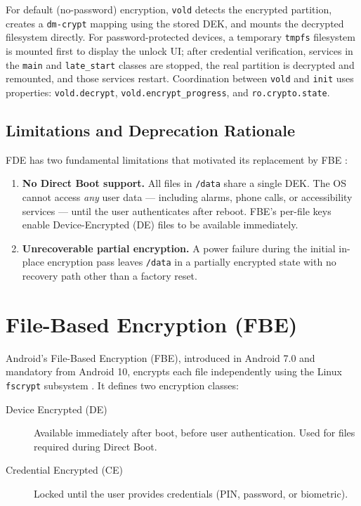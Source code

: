 For default (no-password) encryption, \texttt{vold} detects the encrypted partition, creates a \texttt{dm-crypt} mapping using the stored DEK, and mounts the decrypted filesystem directly. For password-protected devices, a temporary \texttt{tmpfs} filesystem is mounted first to display the unlock UI; after credential verification, services in the \texttt{main} and \texttt{late\_start} classes are stopped, the real partition is decrypted and remounted, and those services restart. Coordination between \texttt{vold} and \texttt{init} uses properties: \texttt{vold.decrypt}, \texttt{vold.encrypt\_progress}, and \texttt{ro.crypto.state}.

\subsection{Limitations and Deprecation Rationale}
\label{sec:bg_fde_limitations}

FDE has two fundamental limitations that motivated its replacement by FBE
\cite{android_fde}:

\begin{enumerate}
    \item \textbf{No Direct Boot support.}  All files in \texttt{/data} share a single DEK. The OS cannot access \emph{any} user data --- including alarms, phone calls, or accessibility services --- until the user authenticates after reboot. FBE's per-file keys enable Device-Encrypted (DE) files to be available immediately.
    \item \textbf{Unrecoverable partial encryption.}  A power failure during the initial in-place encryption pass leaves \texttt{/data} in a partially encrypted state with no recovery path other than a factory reset.
\end{enumerate}

\section{File-Based Encryption (FBE)}
\label{sec:bg_fbe}

Android's File-Based Encryption (FBE), introduced in Android 7.0 and mandatory from Android 10, encrypts each file independently using the Linux \texttt{fscrypt} subsystem \cite{android_fbe}. It defines two encryption classes:

\begin{description}
    \item[Device Encrypted (DE)] Available immediately after boot, before user authentication. Used for files required during Direct Boot.
    \item[Credential Encrypted (CE)] Locked until the user provides credentials (PIN, password, or biometric).
\end{description}

